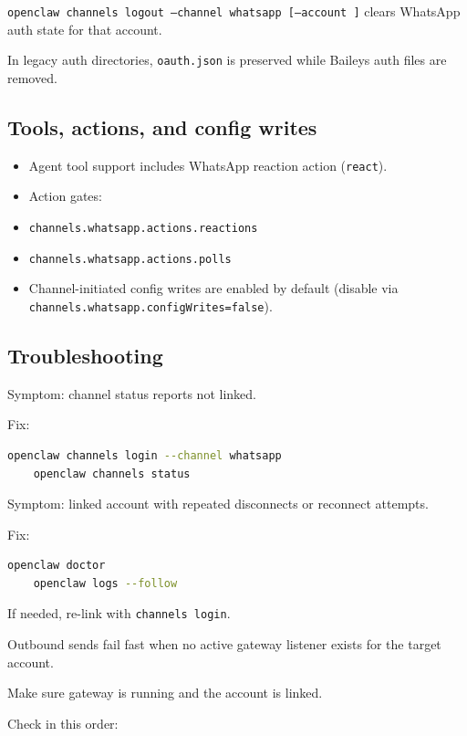 \texttt{openclaw channels logout --channel whatsapp [--account ]} clears WhatsApp auth state for that account.

In legacy auth directories, \texttt{oauth.json} is preserved while Baileys auth files are removed.


\subsection{Tools, actions, and config writes}


\begin{itemize}
  \item Agent tool support includes WhatsApp reaction action (\texttt{react}).
  \item Action gates:
  \item \texttt{channels.whatsapp.actions.reactions}
  \item \texttt{channels.whatsapp.actions.polls}
  \item Channel-initiated config writes are enabled by default (disable via \texttt{channels.whatsapp.configWrites=false}).
\end{itemize}


\subsection{Troubleshooting}


Symptom: channel status reports not linked.

Fix:

\begin{lstlisting}[language=bash]
    openclaw channels login --channel whatsapp
    openclaw channels status
\end{lstlisting}



Symptom: linked account with repeated disconnects or reconnect attempts.

Fix:

\begin{lstlisting}[language=bash]
    openclaw doctor
    openclaw logs --follow
\end{lstlisting}


If needed, re-link with \texttt{channels login}.


Outbound sends fail fast when no active gateway listener exists for the target account.

Make sure gateway is running and the account is linked.


Check in this order:

